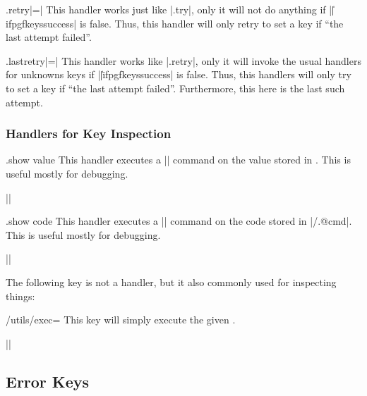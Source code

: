 \begin{handler}{{.retry}|=|}
  This handler works just like |.try|, only it will not do anything if
  |\||ifpgfkeyssuccess| is false. Thus, this handler will only retry
  to set a key if ``the last attempt failed''. 
\begin{codeexample}[]
\end{codeexample}
\end{handler}

\begin{handler}{{.lastretry}|=|}
	This handler works like |.retry|, only it will invoke the usual handlers for unknowns keys if |\||ifpgfkeyssuccess| is false. Thus, this handlers will only try to set a key if ``the last attempt failed''. Furthermore, this here is the last such attempt.
\end{handler}


\subsubsection{Handlers for Key Inspection}

\begin{handler}{{.show value}}
  This handler executes a |\show| command on the value stored in
  . This is useful mostly for debugging.

  \example ||
\end{handler}

\begin{handler}{{.show code}}
  This handler executes a |\show| command on the code stored in
  |/.@cmd|. This is useful mostly for debugging.

  \example ||
\end{handler}

The following key is not a handler, but it also commonly used for
inspecting things:
\begin{key}{/utils/exec=}
  This key will simply execute the given . 

  \example ||
\end{key}


\subsection{Error Keys}

